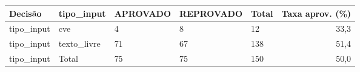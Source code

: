 \begin{tabular}{lllllr}
\toprule
Decisão & tipo\_input & APROVADO & REPROVADO & Total & Taxa aprov. (\%) \\
\midrule
tipo\_input & cve & 4 & 8 & 12 & 33,3 \\
tipo\_input & texto\_livre & 71 & 67 & 138 & 51,4 \\
tipo\_input & Total & 75 & 75 & 150 & 50,0 \\
\bottomrule
\end{tabular}
